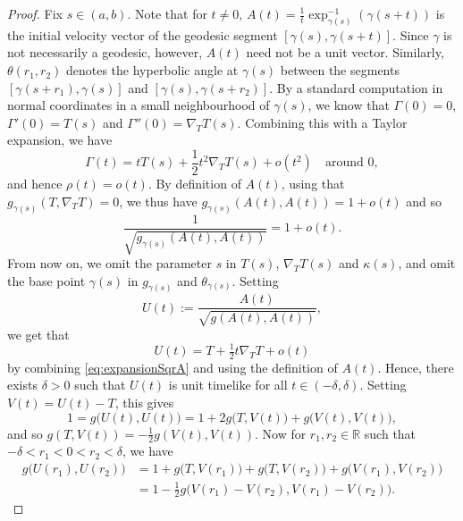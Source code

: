 \documentclass[hidelinks,12pt,a4paper]{article}
\numberwithin{equation}{section}
\theoremstyle{plain}
\theoremstyle{definition}
\newcommand{\R}{\mathbb R}
\begin{document}
\begin{proof}
Fix $s\in (a,b)$. 
Note that for $t \neq 0$, $A(t)=\frac1t \exp_{\gamma(s)}^{-1}(\gamma(s+t))$ is the initial velocity vector of the geodesic segment $[\gamma(s),\gamma(s+t)]$. 
Since $\gamma$ is not necessarily a geodesic, however, $A(t)$ need not be a unit vector.
Similarly, $\theta(r_1,r_2)$ denotes the hyperbolic angle at $\gamma(s)$ between the segments $[\gamma(s+r_1),\gamma(s)]$ and $[\gamma(s),\gamma(s+r_2)]$. 
By a standard computation in normal coordinates in a small neighbourhood of $\gamma(s)$, we know that $\Gamma(0)=0$, $\Gamma'(0)=T(s)$ and $ \Gamma''(0)=\nabla_TT(s)$. 
Combining this with a Taylor expansion, we have
\begin{equation*}
\Gamma(t)=tT(s)+\frac12 t^2\nabla_TT(s)+o(t^2) \quad \mathrm{around}\,\,0,
\end{equation*}
and hence $\rho(t)=o(t)$. By definition of $A(t)$, using that $g_{\gamma(s)}(T,\nabla_T T)=0$, we thus have $g_{\gamma(s)}(A(t), A(t)) = 1 + o(t)$ and so
\begin{equation}
\label{eq:expansionSqrA}
\frac{1}{\sqrt{g_{\gamma(s)}(A(t),A(t))}} = 1 + o(t).
\end{equation}
From now on, we omit the parameter $s$ in $T(s)$, $\nabla_T T(s)$ and $\kappa(s)$, and omit the base point $\gamma(s)$ in $g_{\gamma(s)}$ and $\theta_{\gamma(s)}$.
Setting
\begin{equation*}
\label{eq: definitition U(t)}
U(t):=\frac{A(t)}{\sqrt{g(A(t),A(t))}},
\end{equation*}
we get that
\begin{equation}
\label{eq:expansionU}
U(t) = T + \tfrac{1}{2}t\nabla_T T + o(t)
\end{equation}
by combining \eqref{eq:expansionSqrA} and using the definition of $A(t)$. Hence, there exists $\delta >0$ such that $U(t)$ is unit timelike for all $t \in (-\delta, \delta)$. Setting $V(t) = U(t) - T$, this gives
\begin{equation*}
1 = g\big(U(t), U(t)\big) = 1 + 2 g\big(T, V(t)\big) + g\big(V(t), V(t)\big),
\end{equation*}
and so $g(T,V(t)) = - \tfrac{1}{2}g(V(t), V(t))$. Now for $r_1, r_2 \in \R$ such that $-\delta < r_1 < 0 < r_2 < \delta$, we have
\begin{align*}
g\big(U(r_1), U(r_2)\big) &= 1 + g\big(T,V(r_1)\big) + g\big(T, V(r_2)\big) + g\big(V(r_1),V(r_2)\big)\\
&= 1 - \tfrac{1}{2}g\big(V(r_1) - V(r_2), V(r_1) - V(r_2)\big).

\end{align*}
\end{proof}
\end{document}

